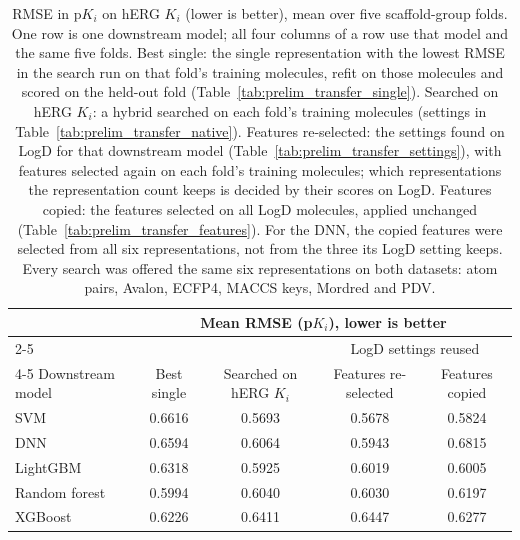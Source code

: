 \begin{table}[htbp]
\centering
\small
\begin{tabular}{@{}lcccc@{}}
\toprule
 & \multicolumn{4}{c}{Mean RMSE (p$K_i$), lower is better} \\
\cmidrule(l){2-5}
 & & & \multicolumn{2}{c}{LogD settings reused} \\
\cmidrule(l){4-5}
Downstream model & Best single & Searched on hERG $K_i$ & Features re-selected & Features copied \\
\midrule
SVM & 0.6616 & 0.5693 & 0.5678 & 0.5824 \\
DNN & 0.6594 & 0.6064 & 0.5943 & 0.6815 \\
LightGBM & 0.6318 & 0.5925 & 0.6019 & 0.6005 \\
Random forest & 0.5994 & 0.6040 & 0.6030 & 0.6197 \\
XGBoost & 0.6226 & 0.6411 & 0.6447 & 0.6277 \\
\bottomrule
\end{tabular}
\caption[Reusing search settings from LogD on hERG $K_i$.]{RMSE in p$K_i$ on hERG $K_i$ (lower is better), mean over five scaffold-group folds. One row is one downstream model; all four columns of a row use that model and the same five folds. Best single: the single representation with the lowest RMSE in the search run on that fold's training molecules, refit on those molecules and scored on the held-out fold (Table~\ref{tab:prelim_transfer_single}). Searched on hERG $K_i$: a hybrid searched on each fold's training molecules (settings in Table~\ref{tab:prelim_transfer_native}). Features re-selected: the settings found on LogD for that downstream model (Table~\ref{tab:prelim_transfer_settings}), with features selected again on each fold's training molecules; which representations the representation count keeps is decided by their scores on LogD. Features copied: the features selected on all LogD molecules, applied unchanged (Table~\ref{tab:prelim_transfer_features}). For the DNN, the copied features were selected from all six representations, not from the three its LogD setting keeps. Every search was offered the same six representations on both datasets: atom pairs, Avalon, ECFP4, MACCS keys, Mordred and PDV.}
\label{tab:prelim_transfer}
\end{table}

